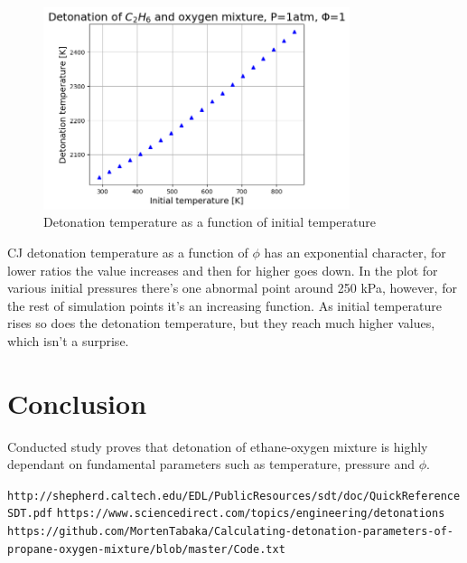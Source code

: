 \documentclass[a4paper]{article}
\begin{document}
\begin{figure}[H]
\centering
\includegraphics[width=0.8\textwidth]{temperature_Ti.png}
\caption{Detonation temperature as a function of initial temperature}
\end{figure}

CJ detonation temperature as a function of $\phi$ has an exponential character, for lower ratios the value increases and then for higher goes down. In the plot for various initial pressures there's one abnormal point around 250 kPa, however, for the rest of simulation points it's an increasing function. As initial temperature rises so does the detonation temperature, but they reach much higher values, which isn't a surprise.

\section{Conclusion}
Conducted study proves that detonation of ethane-oxygen mixture is highly dependant on fundamental parameters such as temperature, pressure and $\phi$.\\

\begin{thebibliography}{9}
\texttt{http://shepherd.caltech.edu/EDL/PublicResources/sdt/doc/QuickReferenceSDT.pdf}
\texttt{https://www.sciencedirect.com/topics/engineering/detonations}
\texttt{https://github.com/MortenTabaka/Calculating-detonation-parameters-of-propane-oxygen-mixture/blob/master/Code.txt}
\end{thebibliography}
\end{document}
